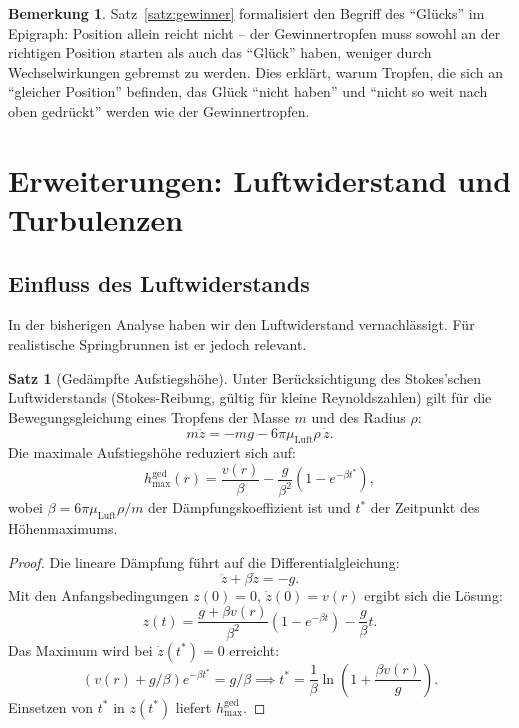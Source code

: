 ﻿\documentclass[a4paper,12pt]{article}
\theoremstyle{definition}
\newtheorem{satz}{Satz}
\newtheorem{bemerkung}{Bemerkung}
\begin{document}
\begin{bemerkung}
Satz~\ref{satz:gewinner} formalisiert den Begriff des ``Glücks'' im Epigraph: Position
allein reicht nicht -- der Gewinnertropfen muss sowohl an der richtigen Position starten
als auch das ``Glück'' haben, weniger durch Wechselwirkungen gebremst zu werden.
Dies erklärt, warum Tropfen, die sich an ``gleicher Position'' befinden, das Glück
``nicht haben'' und ``nicht so weit nach oben gedrückt'' werden wie der Gewinnertropfen.
\end{bemerkung}

\section{Erweiterungen: Luftwiderstand und Turbulenzen}

\subsection{Einfluss des Luftwiderstands}

In der bisherigen Analyse haben wir den Luftwiderstand vernachlässigt.
Für realistische Springbrunnen ist er jedoch relevant.

\begin{satz}[Gedämpfte Aufstiegshöhe]
\label{satz:daempfung}
    Unter Berücksichtigung des Stokes'schen Luftwiderstands (Stokes-Reibung,
    gültig für kleine Reynoldszahlen) gilt für die Bewegungsgleichung eines Tropfens
    der Masse $m$ und des Radius $\rho$:
    \[
    m\ddot{z} = -mg - 6\pi\mu_{\text{Luft}}\rho\,\dot{z}.
    \]
    Die maximale Aufstiegshöhe reduziert sich auf:
    \[
    h_{\max}^{\text{ged}}(r) = \frac{v(r)}{\beta} - \frac{g}{\beta^2}\left(1 - e^{-\beta t^*}\right),
    \]
    wobei $\beta = 6\pi\mu_{\text{Luft}}\rho / m$ der Dämpfungskoeffizient ist
    und $t^*$ der Zeitpunkt des Höhenmaximums.
\end{satz}

\begin{proof}
    Die lineare Dämpfung führt auf die Differentialgleichung:
    \[
    \ddot{z} + \beta\dot{z} = -g.
    \]
    Mit den Anfangsbedingungen $z(0) = 0$, $\dot{z}(0) = v(r)$ ergibt sich die Lösung:
    \[
    z(t) = \frac{g+\beta v(r)}{\beta^2}\left(1 - e^{-\beta t}\right) - \frac{g}{\beta}t.
    \]
    Das Maximum wird bei $\dot{z}(t^*) = 0$ erreicht:
    \[
    (v(r) + g/\beta)e^{-\beta t^*} = g/\beta
    \implies t^* = \frac{1}{\beta}\ln\!\left(1 + \frac{\beta v(r)}{g}\right).
    \]
    Einsetzen von $t^*$ in $z(t^*)$ liefert $h_{\max}^{\text{ged}}$. \qedhere
\end{proof}
\end{document}
